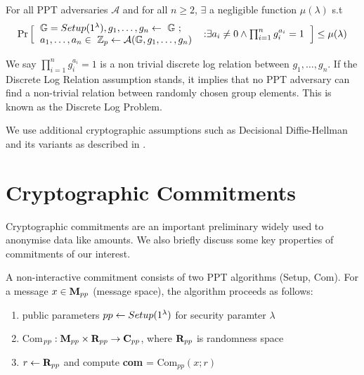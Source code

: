 \begin{defn}
    For all PPT adversaries $\mathcal{A}$ and for all $n\ge2$, $\exists$ a negligible function $\mu (\lambda)$ s.t
    \begin{equation*}
        \Pr 
        \Big[
        \begin{tabular}{ll}
             $\G = Setup(1^{\lambda}), g_1, \dots, g_n \leftarrow \ \G$ ;
             &
             \multirow{2}{*}{$\text{:} \exists a_i \neq 0 \wedge \prod_{i=1}^{n} g_{i}^{a_i} = 1$}\\
             $a_1, \dots, a_n \in \ \Z_p \leftarrow \mathcal{A}(\G, g_1, \dots, g_n)$
             & 
        \end{tabular}
        \Big] 
      \leq \mu(\lambda)
    \end{equation*}
   
    \vspace{0.2mm}
\end{defn} 
We say $\prod_{i=1}^{n} g_{i}^{a_i} = 1$ is a non trivial discrete log relation between $g_1, \dots, g_n$. If the Discrete Log Relation assumption stands, it implies that no \textsf{PPT} adversary can find a non-trivial relation between randomly chosen group elements. 
This is known as the Discrete Log Problem.

We use additional cryptographic assumptions such as Decisional Diffie-Hellman and its variants as described in \cite{Lai2019}.

\section{Cryptographic Commitments}

Cryptographic commitments are an important preliminary widely used to anonymise data like amounts.
We also briefly discuss some key properties of commitments of our interest. 

\begin{defn}[Commitments]
    A non-interactive commitment consists of two PPT algorithms {\normalfont(Setup, Com)}. For a message $x \in {\normalfont \textbf{M}_{pp}}$ (message space), the algorithm proceeds as follows:
    \begin{enumerate}
    \setlength\itemsep{0.3em}
        \item public parameters $pp \leftarrow {\normalfont Setup}(1^{\lambda})$ for security paramter $\lambda$
        \item {\normalfont Com}$_{pp} : {\normalfont \textbf{M}_{pp}} \times {\normalfont \textbf{R}_{pp}} \rightarrow {\normalfont \textbf{C}_{pp}}$, 
        where ${\normalfont \textbf{R}_{pp}}$ is randomness space
        \item $r \leftarrow {\normalfont \textbf{R}_{pp}}$ and compute {\normalfont \textbf{com}} = {\normalfont Com}$_{pp}(x;r)$
    \end{enumerate}
\end{defn}

